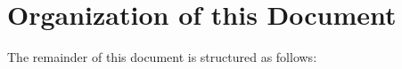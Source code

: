 %
%
%
%
%
%
%
%
%
%
%
%
%

\section{Organization of this Document}
\label{sec:Organization of this document}
The remainder of this document is structured as follows: 

